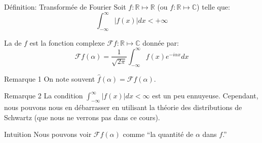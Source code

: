 \documentclass[a4paper]{article}
\begin{document}
\begin{parag}{Définition: Transformée de Fourier}
    Soit $f: \mathbb{R} \mapsto \mathbb{R}$  (ou $f: \mathbb{R} \mapsto \mathbb{C}$) telle que: 
    \[\int_{-\infty}^{\infty} \left|f\left(x\right)\right|dx < +\infty\]
    
    La  de $f$ est la fonction complexe $\mathcal{F}f : \mathbb{R} \mapsto \mathbb{C}$ donnée par: 
    \[\mathcal{F} f\left(\alpha\right) = \frac{1}{\sqrt{2\pi}} \int_{-\infty}^{\infty} f\left(x\right)e^{-i\alpha x}dx\]
    
    \begin{subparag}{Remarque 1}
        On note souvent $\hat{f}\left(\alpha\right) = \mathcal{F}f\left(\alpha\right)$.
    \end{subparag}

    \begin{subparag}{Remarque 2}
        La condition $\int_{-\infty}^{\infty} \left|f\left(x\right)\right|dx < \infty$ est un peu ennuyeuse. Cependant, nous pouvons nous en débarrasser en utilisant la théorie des distributions de Schwartz (que nous ne verrons pas dans ce cours).
    \end{subparag}
    
    \begin{subparag}{Intuition}
        Nous pouvons voir $\mathcal{F} f\left(\alpha\right)$ comme ``la quantité de $\alpha$ dans $f$.''
    \end{subparag}
\end{parag}
\end{document}
